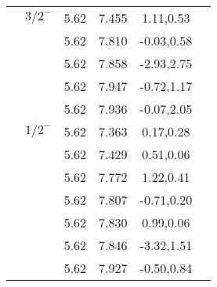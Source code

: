\documentclass[prd,twocolumn,floatfix,nofootinbib]{revtex4}
\begin{document}
\begin{table*}[!htbp]
\begin{tabular}{cccccc}
            &${3/2}^{-}$     &5.62   &7.455 &1.11,0.53 \\
                         &$ $     &5.62   &7.810 &-0.03,0.58  \\
                         &$ $     &5.62   &7.858 &-2.93,2.75  \\
                         &$ $     &5.62   &7.947 &-0.72,1.17 \\
                         &$ $     &5.62   &7.936 &-0.07,2.05 \\
            &${1/2}^{-}$     &5.62   &7.363 &0.17,0.28 \\
                         &$ $     &5.62   &7.429 &0.51,0.06  \\
                         &$ $     &5.62   &7.772 &1.22,0.41  \\
                         &$ $     &5.62   &7.807 &-0.71,0.20 \\
                         &$ $     &5.62   &7.830 &0.99,0.06  \\
                         &$ $     &5.62   &7.846 &-3.32,1.51 \\
                         &$ $     &5.62   &7.927 &-0.50,0.84 \\
       \hline\hline
    \end{tabular}
\end{table*}
\end{document}
